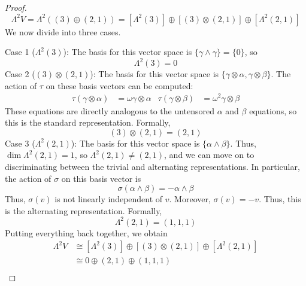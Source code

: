 \documentclass[../psets.tex]{subfiles}
\begin{document}
\begin{enumerate}
\begin{enumerate}
\begin{proof}
            \begin{equation*}
                \Lambda^2V = \Lambda^2((3)\oplus(2,1))
                = [\Lambda^2(3)]\oplus[(3)\otimes(2,1)]\oplus[\Lambda^2(2,1)]
            \end{equation*}
            We now divide into three cases.\par\smallskip
            Case 1 ($\Lambda^2(3)$): The basis for this vector space is $\{\gamma\wedge\gamma\}=\{0\}$, so
            \begin{equation*}
                \Lambda^2(3) = 0
            \end{equation*}
            Case 2 ($(3)\otimes(2,1)$): The basis for this vector space is $\{\gamma\otimes\alpha,\gamma\otimes\beta\}$. The action of $\tau$ on these basis vectors can be computed:
            \begin{align*}
                \tau(\gamma\otimes\alpha) &= \omega\gamma\otimes\alpha&
                \tau(\gamma\otimes\beta) &= \omega^2\gamma\otimes\beta
            \end{align*}
            These equations are directly analogous to the untensored $\alpha$ and $\beta$ equations, so this is the standard representation. Formally,
            \begin{equation*}
                (3)\otimes(2,1) = (2,1)
            \end{equation*}
            Case 3 ($\Lambda^2(2,1)$): The basis for this vector space is $\{\alpha\wedge\beta\}$. Thus, $\dim\Lambda^2(2,1)=1$, so $\Lambda^2(2,1)\neq(2,1)$, and we can move on to discriminating between the trivial and alternating representations. In particular, the action of $\sigma$ on this basis vector is
            \begin{equation*}
                \sigma(\alpha\wedge\beta) = -\alpha\wedge\beta
            \end{equation*}
            Thus, $\sigma(v)$ is not linearly independent of $v$. Moreover, $\sigma(v)=-v$. Thus, this is the alternating representation. Formally,
            \begin{equation*}
                \Lambda^2(2,1) = (1,1,1)
            \end{equation*}
            Putting everything back together, we obtain
            \begin{align*}
                \Lambda^2V &\cong [\Lambda^2(3)]\oplus[(3)\otimes(2,1)]\oplus[\Lambda^2(2,1)]\\
                &\cong 0\oplus(2,1)\oplus(1,1,1)\\

\end{align*}
\end{proof}
\end{enumerate}
\end{enumerate}
\end{document}
